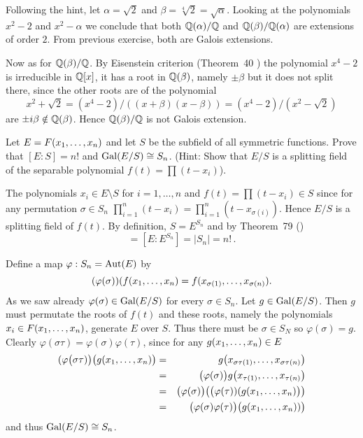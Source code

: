 \begin{myenumerate}
Following the hint,
let \(\alpha=\sqrt{2}\) and \(\beta=\sqrt[4]{2}=\sqrt{\alpha}\).
Looking at the polynomials
\(x^2-2\) and \(x^2-\alpha\)
we conclude that both \(\mathbb{Q}(\alpha)/\mathbb{Q}\) and \(\mathbb{Q}(\beta)/\mathbb{Q}(\alpha)\)
are extensions of order $2$.
From previous exercise, both are Galois extensions.

Now as for \(\mathbb{Q}(\beta)/\mathbb{Q}\).
By Eisenstein criterion (Theorem~40 \cite{Rotman98})
the polynomial \(x^4-2\) is irreducible in \(\mathbb{Q}[x]\),
it has a root in \(\mathbb{Q}(\beta)\), namely \(\pm\beta\)
but it does not split there, since the other roots are
of the polynomial
\begin{equation*}
 x^2+\sqrt{2} = (x^4-2)/\left((x+\beta)(x-\beta)\right) = (x^4-2)/(x^2-\sqrt{2})
\end{equation*}
are \(\pm i\beta \notin \mathbb{Q}(\beta)\).
Hence  \(\mathbb{Q}(\beta)/\mathbb{Q}\) is not Galois extension.

\item
\begin{excopy}
Let \(E=F(x_1,\ldots,x_{n})\) and let $S$ be the subfield of all symmetric functions.
Prove that \([E:S]=n!\) and \(\mathop{\rm Gal}\nolimits(E/S)\cong S_n\).
(Hint: Show that \(E/S\) is a splitting field of the separable polynomial
\(f(t)=\prod(t-x_i)\)).
\end{excopy}

The polynomials \(x_i\in E\setminus S\) for \(i=1,\ldots,n\)
and \(f(t)=\prod(t-x_i)\in S\) since for any permutation \(\sigma\in S_n\)
\(\prod_{i=1}^n(t-x_i) = \prod_{i=1}^n (t-x_{\sigma(i)})\).
Hence \(E/S\) is a splitting field of \(f(t)\).
By definition, \(S = E^{S_n}\) and by Theorem~79 (\cite{Rotman98})
\begin{equation*}
[E:S] = [E:E^{S_n}] = |S_n| = n! \,.
\end{equation*}

Define a map \(\varphi:S_n = \mathop{\rm Aut}\nolimits(E)\) by
\begin{equation*}
(\varphi(\sigma))(f(x_1,\ldots,x_{n}) = f(x_{\sigma(1)},\ldots,x_{\sigma(n)}).
\end{equation*}
As we saw already \(\varphi(\sigma)\in \mathop{\rm Gal}\nolimits(E/S)\) for every \(\sigma\in S_n\).
Let \(g \in \mathop{\rm Gal}\nolimits(E/S)\). Then $g$ must permutate
the roots of \(f(t)\) and these roots,
namely the polynomials \(x_i\in F(x_1,\ldots,x_{n})\),
generate $E$ over $S$.
Thus there must be \(\sigma \in S_N\) so \(\varphi(\sigma)=g\).
Clearly \(\varphi(\sigma\tau) = \varphi(\sigma)\varphi(\tau)\),
since for any \(g(x_1,\ldots,x_{n})\in E\)
\begin{eqnarray*}
 (\varphi\bigl(\sigma\tau)\bigr)\bigl(g(x_1,\ldots,x_{n})\bigr)
 & = & g\bigl(x_{\sigma\tau(1)},\ldots,x_{\sigma\tau(n)}\bigr) \\
 & = & \bigl(\varphi(\sigma)\bigr)g\bigl(x_{\tau(1)},\ldots,x_{\tau(n)}\bigr) \\
 & = & \bigl(\varphi(\sigma)\bigr)
       \bigl(\bigl(\varphi(\tau))(g(x_1,\ldots,x_{n})\bigr)\bigr) \\
 & = & \bigl(\varphi(\sigma)\varphi(\tau)\bigr)\bigl(g(x_1,\ldots,x_{n}))\bigr)
\end{eqnarray*}
and  thus \(\mathop{\rm Gal}\nolimits(E/S)\cong S_n\).


\end{myenumerate}
